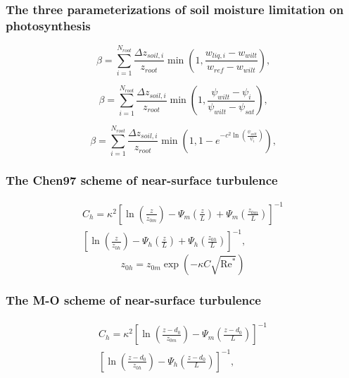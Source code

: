 \documentclass[essd]{copernicus}
\begin{document}
\subsubsection{The three parameterizations of soil moisture limitation on
  photosynthesis}\label{sec:data:noahmp:beta}

\begin{equation}
  \beta = \sum_{i=1}^{N_{root}} \frac{\Delta z_{soil,i}}{z_{root}}
  \min\left(1, \frac{w_{liq,i} - w_{wilt}}{w_{ref} - w_{wilt}}\right)
  \text{,}
\end{equation}

\begin{equation}
  \beta = \sum_{i=1}^{N_{root}} \frac{\Delta z_{soil,i}}{z_{root}}
  \min\left(1, \frac{\psi_{wilt} - \psi_{i}}{\psi_{wilt} - \psi_{sat}}\right)
  \text{,}
\end{equation}

\begin{equation}
  \beta = \sum_{i=1}^{N_{root}} \frac{\Delta z_{soil,i}}{z_{root}}
  \min\left(1, 1 - e^{-c^2 \ln\left(\frac{\psi_{wilt}}{\psi_{i}} \right)} \right)
  \text{,}
\end{equation}

\subsubsection{The Chen97 scheme of near-surface turbulence}

\begin{multline}
  C_h = \kappa^2 \left[ \ln\left(\frac{z}{z_{0m}}\right)
    - \Psi_{m}\left(\frac{z}{L}\right)
    + \Psi_{m}\left(\frac{z_{0m}}{L}\right) \right]^{-1} \\
  \left[ \ln\left(\frac{z}{z_{0h}}\right)
    - \Psi_{h}\left(\frac{z}{L}\right)
    + \Psi_{h}\left(\frac{z_{0h}}{L}\right) \right]^{-1} \text{,}
\end{multline}
\begin{equation}
  z_{0h} = z_{0m} \exp\left(-\kappa C \sqrt{\text{Re}^*}\right)
\end{equation}

\subsubsection{The M-O scheme of near-surface turbulence}

\begin{multline}
  C_h = \kappa^2 \left[ \ln\left(\frac{z-d_0}{z_{0m}}\right)
    - \Psi_{m}\left(\frac{z-d_0}{L}\right) \right]^{-1} \\
  \left[ \ln\left(\frac{z-d_0}{z_{0h}}\right)
    - \Psi_{h}\left(\frac{z-d_0}{L}\right) \right]^{-1}
  \text{,}
\end{multline}
\end{document}
